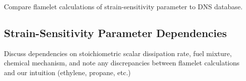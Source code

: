 Compare flamelet calculations of strain-sensitivity parameter to DNS database.


\subsection{Strain-Sensitivity Parameter Dependencies}
\label{sec:transport:ssta:dependencies}

Discuss dependencies on stoichiometric scalar dissipation rate, fuel mixture, chemical mechanism, and note any discrepancies between flamelet calculations and our intuition (ethylene, propane, etc.)

